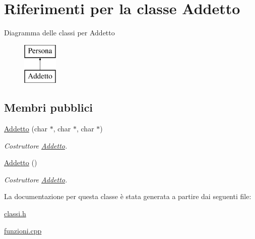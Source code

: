 \hypertarget{class_addetto}{}\section{Riferimenti per la classe Addetto}
\label{class_addetto}
Diagramma delle classi per Addetto\begin{figure}[H]
\begin{center}
\leavevmode
\includegraphics[height=2.000000cm]{class_addetto}
\end{center}
\end{figure}
\subsection*{Membri pubblici}
\begin{DoxyCompactItemize}
\item 
\mbox{\label{class_addetto_a6aab9117b8a6f4187e8ef11bf6d3279b}} 
\mbox{\hyperlink{class_addetto_a6aab9117b8a6f4187e8ef11bf6d3279b}{Addetto}} (char $\ast$, char $\ast$, char $\ast$)
\begin{DoxyCompactList}\small\item\em Costruttore \mbox{\hyperlink{class_addetto}{Addetto}}. \end{DoxyCompactList}\item 
\mbox{\label{class_addetto_ac2edc0ee9e5b3ed99c73ab0a2911ccc9}} 
\mbox{\hyperlink{class_addetto_ac2edc0ee9e5b3ed99c73ab0a2911ccc9}{Addetto}} ()
\begin{DoxyCompactList}\small\item\em Costruttore \mbox{\hyperlink{class_addetto}{Addetto}}. \end{DoxyCompactList}\end{DoxyCompactItemize}


La documentazione per questa classe è stata generata a partire dai seguenti file\+:\begin{DoxyCompactItemize}
\item 
\mbox{\hyperlink{classi_8h}{classi.\+h}}\item 
\mbox{\hyperlink{funzioni_8cpp}{funzioni.\+cpp}}\end{DoxyCompactItemize}
